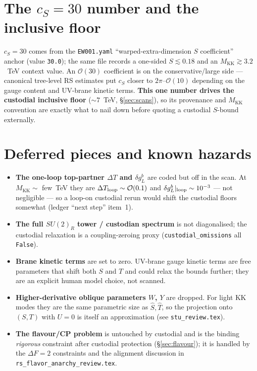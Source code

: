 \documentclass[11pt]{article}
\newcommand{\MKK}{M_{\mathrm{KK}}}
\newcommand{\SUR}{SU(2)_R}
\newcommand{\code}[1]{\texttt{#1}}
\newcommand{\dgL}{\delta g_L^b}
\theoremstyle{definition}
\begin{document}
\section{The $c_S=30$ number and the inclusive floor}
\label{sec:cS}

$c_S=30$ comes from the \code{EW001.yaml} ``warped-extra-dimension $S$
coefficient'' anchor (value \code{30.0}); the same file records a one-sided
$S\lesssim 0.18$ and an $\MKK\gtrsim 3.2$~TeV context value. An $\mathcal{O}(30)$
coefficient is on the conservative/large side --- canonical tree-level RS
estimates put $c_S$ closer to $2\pi$--$\mathcal{O}(10)$ depending on the gauge
content and UV-brane kinetic terms. \textbf{This one number drives the custodial
inclusive floor} ($\sim 7$~TeV, \S\ref{sec:scans}), so its provenance and
$\MKK$ convention are exactly what to nail down before quoting a custodial
$S$-bound externally.

\section{Deferred pieces and known hazards}
\label{sec:deferred}
\begin{itemize}[leftmargin=1.4em]
\item \textbf{The one-loop top-partner $\Delta T$ and $\dgL$} are coded but off in
the scan. At $\MKK\sim$ few~TeV they are $\Delta T_{\rm loop}\sim\mathcal{O}(0.1)$
and $\dgL|_{\rm loop}\sim 10^{-3}$ --- not negligible --- so a loop-on custodial
rerun would shift the custodial floors somewhat (ledger ``next step'' item~1).
\item \textbf{The full $\SUR$ tower / custodian spectrum} is not diagonalised; the
custodial relaxation is a coupling-zeroing proxy
(\code{custodial\_omissions} all \code{False}).
\item \textbf{Brane kinetic terms} are set to zero. UV-brane gauge kinetic terms
are free parameters that shift both $S$ and $T$ and could relax the bounds
further; they are an explicit human model choice, not scanned.
\item \textbf{Higher-derivative oblique parameters $W$, $Y$} are dropped. For
light KK modes they are the same parametric size as $\hat S,\hat T$, so the
projection onto $(S,T)$ with $U=0$ is itself an approximation (see
\code{stu\_review.tex}).
\item \textbf{The flavour/CP problem} is untouched by custodial and is the
binding \emph{rigorous} constraint after custodial protection
(\S\ref{sec:flavour}); it is handled by the $\Delta F=2$ constraints and the
alignment discussion in \code{rs\_flavor\_anarchy\_review.tex}.
\end{itemize}
\end{document}
